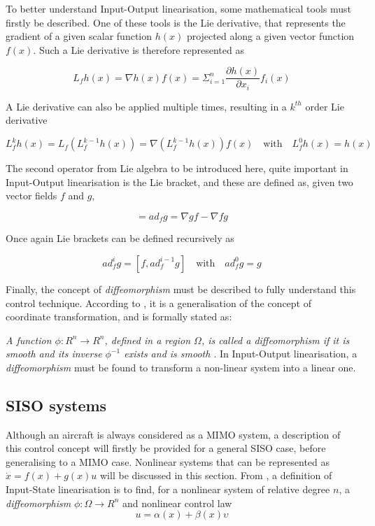 To better understand Input-Output linearisation, some mathematical tools must firstly be described. One of these tools is the Lie derivative, that represents the gradient of a given scalar function $h(x)$ projected along a given vector function $f(x)$. Such a Lie derivative is therefore represented as

\begin{equation}
L_fh(x) = \nabla h(x)f(x) = \Sigma^n_{i=1}\dfrac{\partial h(x)}{\partial x_i}f_i(x)
\end{equation}

A Lie derivative can also be applied multiple times, resulting in a $k^{th}$ order Lie derivative

\begin{equation}
L^k_fh(x)=L_f\left(L^{k-1}_fh(x)\right)=\nabla \left(L^{k-1}_fh(x)\right)f(x) \quad \text{with} \quad L^0_fh(x)=h(x)
\end{equation}

The second operator from Lie algebra to be introduced here, quite important in Input-Output linearisation is the Lie bracket, and these are defined as, given two vector fields $f$ and $g$,

\begin{equation}
[f,g] = ad_f g = \nabla g f - \nabla f g
\end{equation}

Once again Lie brackets can be defined recursively as

\begin{equation}
ad_f^ig=[f, ad_f^{i-1}g] \quad \text{with} \quad ad_f^0g=g
\end{equation}

Finally, the concept of \emph{diffeomorphism} must be described to fully understand this control technique. According to \cite{Slotine+Li}, it is a generalisation of the concept of coordinate transformation, and is formally stated as:

\emph{A function $\phi: R^n\rightarrow R^n$, defined in a region $\Omega$, is called a diffeomorphism if it is smooth and its inverse $\phi^{-1}$ exists and is smooth \cite{Slotine+Li}}. 
In Input-Output linearisation, a \emph{diffeomorphism} must be found to transform a non-linear system into a linear one.
\subsection{SISO systems}
\label{section:background/SISO_NLI}

Although an aircraft is always considered as a MIMO system, a description of this control concept will firstly be provided for a general SISO case, before generalising to a MIMO case. Nonlinear systems that can be represented as $\dot{x}=f(x)+g(x)u$ will be discussed in this section. From \cite{Slotine+Li}, a definition of Input-State linearisation is to find, for a nonlinear system of relative degree $n$, a \emph{diffeomorphism} $\phi:\Omega \rightarrow R^n$ and nonlinear control law
\begin{equation}
u=\alpha(x) + \beta(x)\upsilon
\label{eq:nli_control_law}
\end{equation}

